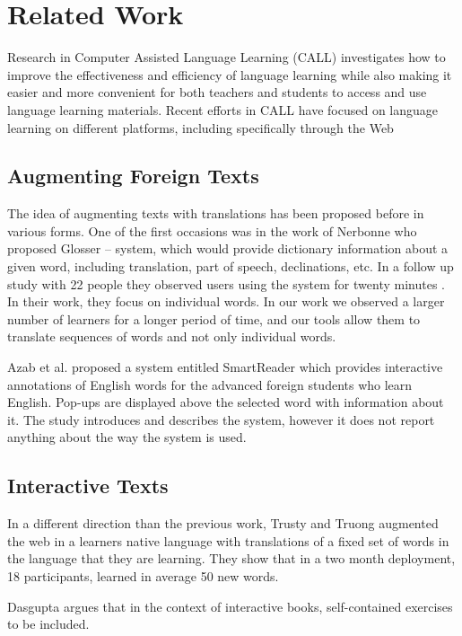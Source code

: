 \newpage
\section{Related Work}

Research in Computer Assisted Language Learning (CALL) investigates how to improve the effectiveness and efficiency of language learning while also making it easier and more convenient for both teachers and students to access and use language learning materials\cite{levy2013call}. Recent efforts in CALL have focused on language learning on different platforms, including specifically through the Web


\subsection{Augmenting Foreign Texts}
The idea of augmenting texts with translations has been proposed before in various forms. One of the first occasions was in the work of Nerbonne \cite{Nerb99-Assistant} who proposed Glosser -- system, which would provide dictionary information about a given word, including translation, part of speech, declinations, etc. In a follow up study with 22 people they observed users using the system for twenty minutes \cite{Dokter98-UserStudy}. In their work, they focus on individual words. In our work we observed a larger number of learners for a longer period of time, and our tools allow them to translate sequences of words and not only individual words. 

Azab et al. \cite{Azab13-nlp} proposed a system entitled SmartReader which provides interactive annotations of English words for the advanced foreign students who learn English. Pop-ups are displayed above the selected word with information about it. The study introduces and describes the system, however it does not report anything about the way the system is used.

\subsection{Interactive Texts}
In a different direction than the previous work, Trusty and Truong augmented the web in a learners native language with translations of a fixed set of words in the language that they are learning\cite{Trus11web}. They show that in a two month deployment, 18 participants, learned in average 50 new words.

Dasgupta argues that in the context of interactive books, self-contained exercises to be included. \cite{Dasgupta10-Play}

